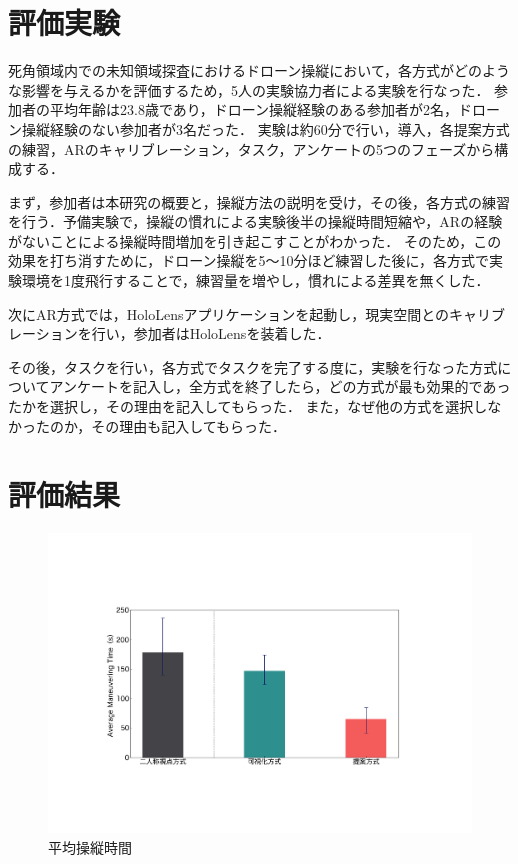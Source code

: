 \documentclass[a4paper,11pt]{ujreport}
\begin{document}
\section{評価実験}
\label{sec:Experiment}

死角領域内での未知領域探査におけるドローン操縦において，各方式がどのような影響を与えるかを評価するため，5人の実験協力者による実験を行なった．
参加者の平均年齢は23.8歳であり，ドローン操縦経験のある参加者が2名，ドローン操縦経験のない参加者が3名だった．
実験は約60分で行い，導入，各提案方式の練習，ARのキャリブレーション，タスク，アンケートの5つのフェーズから構成する．
\par
まず，参加者は本研究の概要と，操縦方法の説明を受け，その後，各方式の練習を行う．予備実験で，操縦の慣れによる実験後半の操縦時間短縮や，ARの経験がないことによる操縦時間増加を引き起こすことがわかった．
そのため，この効果を打ち消すために，ドローン操縦を5〜10分ほど練習した後に，各方式で実験環境を1度飛行することで，練習量を増やし，慣れによる差異を無くした．
\par
次にAR方式では，HoloLensアプリケーションを起動し，現実空間とのキャリブレーションを行い，参加者はHoloLensを装着した．
\par
その後，タスクを行い，各方式でタスクを完了する度に，実験を行なった方式についてアンケートを記入し，全方式を終了したら，どの方式が最も効果的であったかを選択し，その理由を記入してもらった．
また，なぜ他の方式を選択しなかったのか，その理由も記入してもらった．

\section{評価結果}
\label{chap:Performance}

\begin{figure}[!b]
  \centering
  \includegraphics[width=0.7\linewidth]{img/05_time.pdf}
  \caption{平均操縦時間}
  \label{fig:05_time}
\end{figure}
\end{document}
